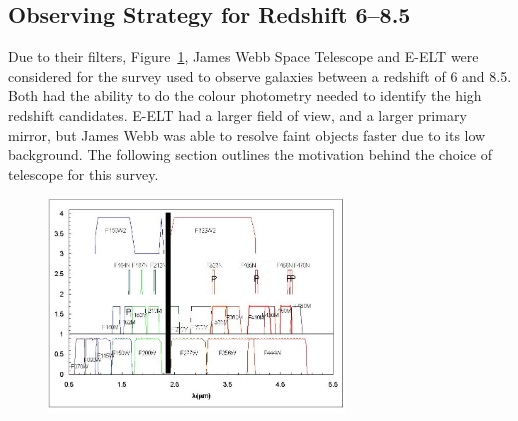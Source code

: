 
\subsection{Observing Strategy for Redshift 6--8.5} %
\label{sec:observing_strategy_for_redshift_6_8}
	Due to their filters, Figure~\ref{fig:JWST_NIRspec_filters}, James Webb Space Telescope and E-ELT were considered for the survey used to observe galaxies between a redshift of 6 and 8.5. Both had the ability to do the colour photometry needed to identify the high redshift candidates. E-ELT had a larger field of view, and a larger primary mirror, but James Webb was able to resolve faint objects faster due to its low background. The following section outlines the motivation behind the choice of telescope for this survey.
	\begin{figure}[htbp]
		\centering
			\includegraphics[width=0.7\textwidth]{../Images/JWST_NIRspec_filters.jpeg}
		\caption{\label{fig:JWST_NIRspec_filters}}
	\end{figure}

